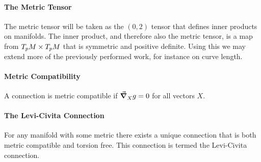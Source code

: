 \paragraph{The Metric Tensor}
The metric tensor will be taken as the $(0, 2)$ tensor that defines inner products on manifolds. The inner product, and therefore also the metric tensor, is a map from $T_{p}M\times T_{p}M$ that is symmetric and positive definite. Using this we may extend more of the previously performed work, for instance on curve length.

\paragraph{Metric Compatibility}
A connection is metric compatible if $\grad_{X}^{}{g} = 0$ for all vectors $X$.

\paragraph{The Levi-Civita Connection}
For any manifold with some metric there exists a unique connection that is both metric compatible and torsion free. This connection is termed the Levi-Civita connection.

